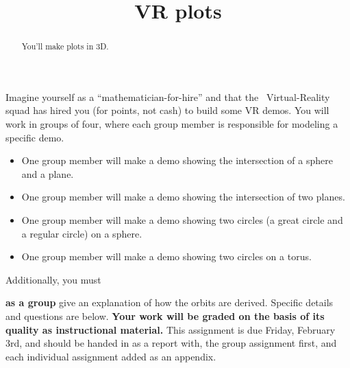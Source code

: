 \documentclass{ximera}
\title{VR plots}
\begin{document}
\begin{abstract}
  You'll make plots in 3D.
\end{abstract}
\maketitle

Imagine yourself as a ``mathematician-for-hire'' and that the
\mooculus\ Virtual-Reality squad has hired you (for points, not cash)
to build some VR demos. You will work in groups of four, where each
group member is responsible for modeling a specific demo.
\begin{itemize}
\item One group member will make a demo showing the intersection of a
  sphere and a plane.
\item One group member will make a demo showing the intersection of
  two planes.
\item One group member will make a demo showing two circles (a great
  circle and a regular circle) on a sphere.
\item One group member will make a demo showing two circles on a
  torus.
\end{itemize}
Additionally, you must




\textbf{as a group} give an explanation of how
the orbits are derived. Specific details and questions are below.
\textbf{Your work will be graded on the basis of its quality as instructional
material.}  This assignment is due Friday, February 3rd, and should be
handed in as a report with, the group assignment first, and each
individual assignment added as an appendix.
\end{document}
